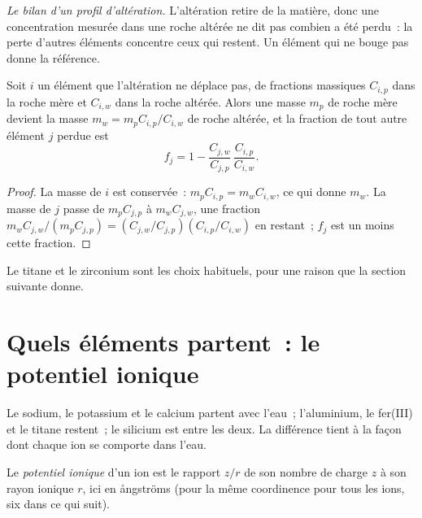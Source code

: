 \emph{Le bilan d'un profil d'altération.} L'altération retire de la matière, donc une
concentration mesurée dans une roche altérée ne dit pas combien a été perdu~:
la perte d'autres éléments concentre ceux qui restent. Un élément qui
ne bouge pas donne la référence.

\begin{proposition}\label{prop:b1:weathering-clays:immobile}
Soit $i$ un élément que l'altération ne déplace pas, de fractions massiques
$C_{i,p}$ dans la roche mère et $C_{i,w}$ dans la roche altérée. Alors une masse
$m_p$ de roche mère devient la masse $m_w = m_p C_{i,p}/C_{i,w}$ de roche
altérée, et la fraction de tout autre élément $j$ perdue est
\[
  f_j = 1 - \frac{C_{j,w}}{C_{j,p}}\,\frac{C_{i,p}}{C_{i,w}} .
\]
\end{proposition}

\begin{proof}
La masse de $i$ est conservée~: $m_p C_{i,p} = m_w C_{i,w}$, ce qui donne $m_w$.
La masse de $j$ passe de $m_p C_{j,p}$ à $m_w C_{j,w}$, une fraction
$m_w C_{j,w}/(m_p C_{j,p}) = (C_{j,w}/C_{j,p})(C_{i,p}/C_{i,w})$ en
restant~; $f_j$ est un moins cette fraction.
\end{proof}

Le titane et le zirconium sont les choix habituels, pour une raison que la section suivante
donne.

\section{Quels éléments partent~: le potentiel ionique}\label{sec:b1:weathering-clays:ionic}

Le sodium, le potassium et le calcium partent avec l'eau~; l'aluminium, le fer(III) et
le titane restent~; le silicium est entre les deux. La différence tient à la façon dont chaque ion
se comporte dans l'eau.

\begin{definition}\label{def:b1:weathering-clays:ionic-potential}
Le \emph{potentiel ionique} d'un ion est le rapport $z/r$
de son nombre de charge $z$ à son rayon ionique $r$, ici en ångströms (pour la
même coordinence pour tous les ions, six dans ce qui suit).
\end{definition}

